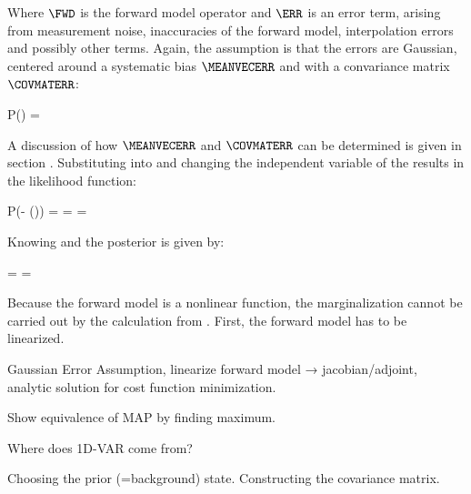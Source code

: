     Where $\FWD$ is the forward model operator and $\ERR$ is an error term,
    arising from measurement noise, inaccuracies of the forward model,
    interpolation errors and possibly other terms. Again, the assumption is
    that the errors are Gaussian, centered around a systematic bias
    $\MEANVECERR$ and with a convariance matrix $\COVMATERR$:

    \startformula
        P(\ERR) = \GAUSS{\ERR}{\MEANVECERR}{\COVMATERR}
    \stopformula

    A discussion of how $\MEANVECERR$ and $\COVMATERR$ can be determined is
    given in section . Substituting 
    into  and changing the independent variable of
    the {\PDF} results in the likelihood function:
    
    \placesubformula
    \startformula
    \startalign[n=3,align={right,middle,left}]
        \NC P(\VECY - \FWD(\VECX)) = \NC \GAUSS{\VECY - \FWD(\VECX)}{\MEANVECERR}{\COVMATERR} \NC \NR
        \NC = \NC \GAUSS{\VECY}{\FWD(\VECX)+\MEANVECERR}{\COVMATERR} \NC = \LIKELIHOOD {}
    \stopalign
    \stopformula

    Knowing  and  the
    posterior {\PDF} is given by:

    \startformula
        \POSTERIOR
        = \frac{\LIKELIHOOD \PRIOR}{\NORMALIZATION}
        = \frac{\GAUSS{\VECY}{\FWD(\VECX)+\MEANVECERR}{\COVMATERR}~\GAUSS{\VECX}{\MEANVECA}{\COVMATA}}{\NORMALIZATION}
    \stopformula

    Because the forward model is a nonlinear function, the marginalization
    cannot be carried out by the calculation from . First,
    the forward model has to be linearized.

    \startsubsection[title=An Iterative Solution]

        Gaussian Error Assumption, linearize forward model → jacobian/adjoint,
        analytic solution for cost function minimization.

        Show equivalence of MAP by finding maximum.

        Where does 1D-VAR come from?

    \stopsubsection

    \startsubsection[title={Constructing the Prior},reference=ret_constprior]

        Choosing the prior (=background) state. Constructing the covariance
        matrix.

